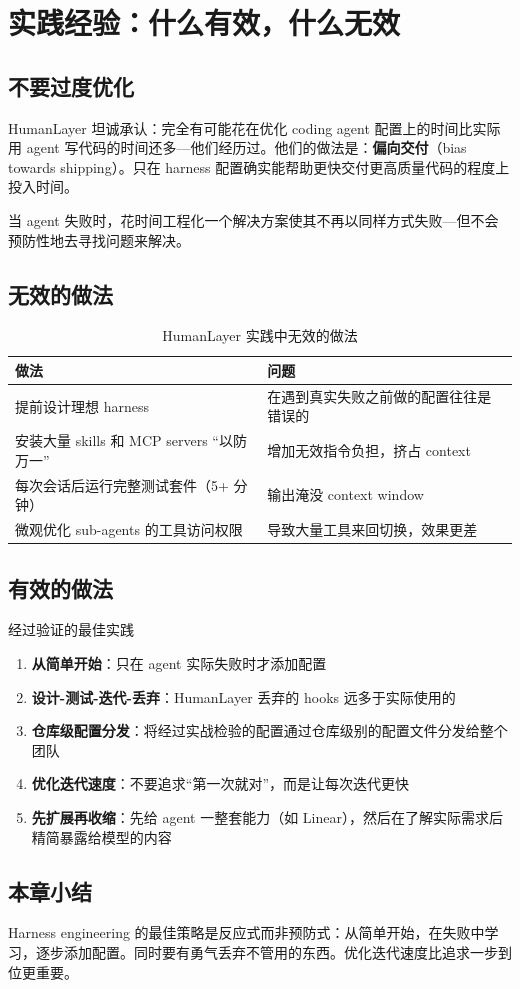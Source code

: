 \section{实践经验：什么有效，什么无效}

\subsection{不要过度优化}

HumanLayer 坦诚承认：完全有可能花在优化 coding agent 配置上的时间比实际用 agent 写代码的时间还多---他们经历过。他们的做法是：\textbf{偏向交付}（bias towards shipping）。只在 harness 配置确实能帮助更快交付更高质量代码的程度上投入时间。

当 agent 失败时，花时间工程化一个解决方案使其不再以同样方式失败---但不会预防性地去寻找问题来解决。

\subsection{无效的做法}

\begin{table}[H]
\centering
\caption{HumanLayer 实践中无效的做法}
\begin{tabular}{@{}p{5cm}p{8cm}@{}}
\toprule
\textbf{做法} & \textbf{问题} \\
\midrule
提前设计理想 harness & 在遇到真实失败之前做的配置往往是错误的 \\
安装大量 skills 和 MCP servers ``以防万一'' & 增加无效指令负担，挤占 context \\
每次会话后运行完整测试套件（5+ 分钟） & 输出淹没 context window \\
微观优化 sub-agents 的工具访问权限 & 导致大量工具来回切换，效果更差 \\
\bottomrule
\end{tabular}
\end{table}

\subsection{有效的做法}

\begin{importantbox}{经过验证的最佳实践}
\begin{enumerate}[leftmargin=1.5em]
    \item \textbf{从简单开始}：只在 agent 实际失败时才添加配置
    \item \textbf{设计-测试-迭代-丢弃}：HumanLayer 丢弃的 hooks 远多于实际使用的
    \item \textbf{仓库级配置分发}：将经过实战检验的配置通过仓库级别的配置文件分发给整个团队
    \item \textbf{优化迭代速度}：不要追求``第一次就对''，而是让每次迭代更快
    \item \textbf{先扩展再收缩}：先给 agent 一整套能力（如 Linear），然后在了解实际需求后精简暴露给模型的内容
\end{enumerate}
\end{importantbox}

\subsection{本章小结}

Harness engineering 的最佳策略是反应式而非预防式：从简单开始，在失败中学习，逐步添加配置。同时要有勇气丢弃不管用的东西。优化迭代速度比追求一步到位更重要。



